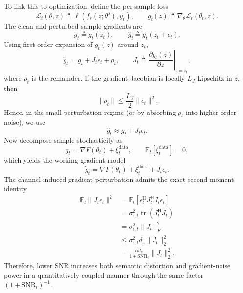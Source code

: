 \documentclass[10pt,journal]{IEEEtran}
\begin{document}
To link this to optimization, define the per-sample loss
\begin{equation}
\mathcal{L}_t(\theta,z) \triangleq \ell(f_s(z;\theta^s),y_t),
\qquad
g_t(z) \triangleq \nabla_{\theta}\mathcal{L}_t(\theta_t,z).
\end{equation}
The clean and perturbed sample gradients are
\begin{equation}
g_t \triangleq g_t(z_t),
\qquad
\hat{g}_t \triangleq g_t(z_t+\epsilon_t).
\end{equation}
Using first-order expansion of $g_t(z)$ around $z_t$,
\begin{equation}
\hat{g}_t
=
g_t
+
J_t\epsilon_t
+
\rho_t,
\qquad
J_t \triangleq \left.\frac{\partial g_t(z)}{\partial z}\right|_{z=z_t},
\end{equation}
where $\rho_t$ is the remainder. If the gradient Jacobian is locally $L_J$-Lipschitz in $z$, then
\begin{equation}
\|\rho_t\|
\le
\frac{L_J}{2}\|\epsilon_t\|^2.
\end{equation}
Hence, in the small-perturbation regime (or by absorbing $\rho_t$ into higher-order noise), we use
\begin{equation}
\hat{g}_t \approx g_t + J_t\epsilon_t.
\end{equation}
Now decompose sample stochasticity as
\begin{equation}
g_t = \nabla F(\theta_t)+\xi_t^{\mathrm{data}},
\qquad
\mathbb{E}_t[\xi_t^{\mathrm{data}}]=0,
\end{equation}
which yields the working gradient model
\begin{equation}
\tilde{g}_t
=
\nabla F(\theta_t)
+
\xi_t^{\mathrm{data}}
+
J_t\epsilon_t.
\end{equation}
The channel-induced gradient perturbation admits the exact second-moment identity
\begin{equation}
\begin{aligned}
\mathbb{E}_t\|J_t\epsilon_t\|^2
&=
\mathbb{E}_t\!\left[\epsilon_t^{\mathrm{H}}J_t^{\mathrm{H}}J_t\epsilon_t\right] \\
&=
\sigma_{\epsilon,t}^2\operatorname{tr}(J_t^{\mathrm{H}}J_t) \\
&=
\sigma_{\epsilon,t}^2\|J_t\|_F^2 \\
&\le
\sigma_{\epsilon,t}^2 d_z\|J_t\|_2^2 \\
&=
\frac{\alpha d_z}{1+\mathrm{SNR}_t}\|J_t\|_2^2.
\end{aligned}
\end{equation}
Therefore, lower SNR increases both semantic distortion and gradient-noise power in a quantitatively coupled manner through the same factor $(1+\mathrm{SNR}_t)^{-1}$.
\end{document}
